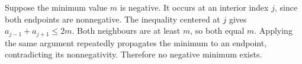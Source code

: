 Suppose the minimum value $m$ is negative. It occurs at an interior index $j$, since both endpoints are nonnegative. The inequality centered at $j$ gives $a_{j-1}+a_{j+1}\le2m$. Both neighbours are at least $m$, so both equal $m$. Applying the same argument repeatedly propagates the minimum to an endpoint, contradicting its nonnegativity. Therefore no negative minimum exists.
